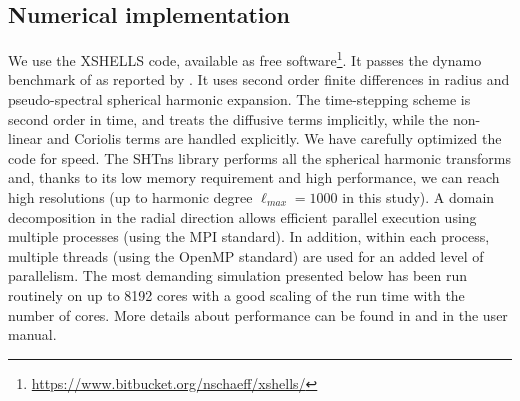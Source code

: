 \documentclass[12pt, a4paper]{article}
\begin{document}
\subsection{Numerical implementation}

We use the XSHELLS code, available as free software\footnote{\label{xsweb}\url{https://www.bitbucket.org/nschaeff/xshells/}}.
It passes the dynamo benchmark of \citet{christensen2001} as reported by \citet{matsui2016}.
It uses second order finite differences in radius and pseudo-spectral spherical harmonic expansion.
The time-stepping scheme is second order in time, and treats the diffusive terms implicitly, while the non-linear and Coriolis terms are handled explicitly.
We have carefully optimized the code for speed.
The SHTns library \citep{schaeffer2013} performs all the spherical harmonic transforms and, thanks to its low memory requirement and high performance, we can reach high resolutions (up to harmonic degree $\ell_{max}=1000$ in this study).
A domain decomposition in the radial direction allows efficient parallel execution using multiple processes (using the MPI standard).
In addition, within each process, multiple threads (using the OpenMP standard) are used for an added level of parallelism.
The most demanding simulation presented below has been run routinely on up to 8192 cores with a good scaling of the run time with the number of cores.
More details about performance can be found in \citet{matsui2016} and in the user manual\footnotemark[2].
\end{document}
